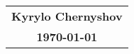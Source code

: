 \documentclass[12pt]{article}
\newcommand{\name}{Kyrylo Chernyshov}
\begin{document}
\begin{center}
\begin{tabular}{c}
\textbf{\name} \\
\textbf{\today}
\end{tabular}
\end{center}
\doublespacing
\end{document}
